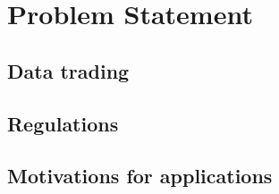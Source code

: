 \chapter{Problem Statement}
\label{problem}

\section{Data trading}\label{problem:data_trading}

\section{Regulations}\label{problem:regulations}

\section{Motivations for applications}\label{problem:motivations}
